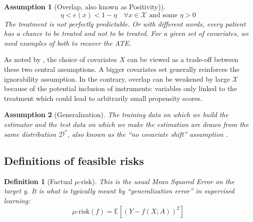 \documentclass[a4paper,num-refs]{oup-contemporary}%
\newtheorem{definition}{Definition}
\newtheorem{assumption}{Assumption}
\begin{document}
\begin{assumption}[Overlap, also known as Positivity)]\label{assumption:overlap}
    \begin{equation*}\label{eq:overlap}
        \eta < e(x) < 1 - \eta \quad \forall x \in \mathcal X \text{ and some } \eta > 0
    \end{equation*}
    The treatment is not perfectly predictable. Or with different words, every
    patient has a chance to be treated and not to be treated. For a given set of
    covariates, we need examples of both to recover the ATE.
\end{assumption}

As noted by \cite{damour_overlap_2020}, the choice of covariates $X$ can
be viewed as a trade-off between these two central assumptions. A bigger
covariates set generally reinforces the ignorability assumption. In the
contrary, overlap can be weakened by large $\mathcal{X}$ because of the
potential inclusion of instruments: variables only linked to the treatment which
could lead to arbitrarily small propensity scores.


\begin{assumption}[Generalization]\label{assumption:generalization} The training
    data on which we build the estimator and the test data on which we make the
    estimation are drawn from the same distribution $\mathcal D^*$, also known as
    the ``no covariate shift'' assumption \cite{jesson_identifying_2020}.
\end{assumption}

\subsection{Definitions of feasible risks}\label{def:feasible_risks}


\begin{definition}[Factual $\mu\text{-risk}$]\label{def:mu_risk}
    \cite{shalit_estimating_2017} This is the usual Mean Squared Error on
    the target y. It is what is typically meant by ``generalization error'' in
    supervised learning:
    \begin{equation*}\label{eq:mu_risk}
        \mu\text{-risk}(f)=\mathbb{E}\left[(Y-f(X ; A))^2 \right]
    \end{equation*}
\end{definition}
\end{document}
